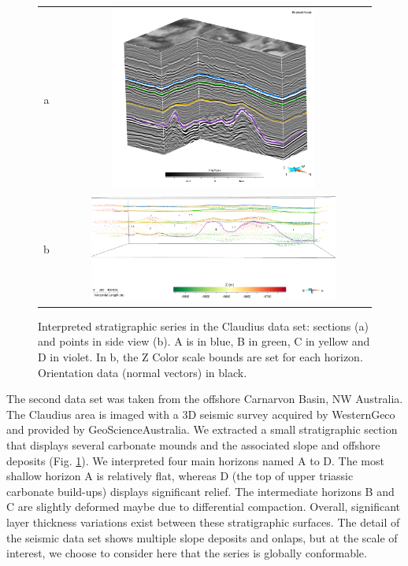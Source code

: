 \documentclass[final]{ring20}
\begin{document}
\begin{figure}

\centering\begin{tabular}{cc}
a & \includegraphics[width=0.7\textwidth,height=6cm]{Claudius}\\
b & \includegraphics[width=0.8\textwidth]{Claudius1} \\
\end{tabular}
\caption{Interpreted stratigraphic series in the Claudius data set: sections (a) and points in side view (b). A is in blue, B in green, C in yellow and D in violet. In b, the Z Color scale bounds are set for each horizon. Orientation data (normal vectors) in black.}
\label{fig:ClaudiusData}
\end{figure}


The second data set was taken from the offshore Carnarvon Basin, NW Australia. The Claudius area is imaged with a 3D seismic survey acquired by WesternGeco and provided by GeoScienceAustralia. We extracted a small stratigraphic section that displays several carbonate mounds and the associated slope and offshore deposits (Fig. \ref{fig:ClaudiusData}). We interpreted four main horizons named A to D. The most shallow horizon A is relatively flat, whereas D (the top of upper triassic carbonate build-ups) displays significant relief. The intermediate horizons B and C are slightly deformed maybe due to differential compaction. Overall, significant layer thickness variations exist between these stratigraphic surfaces. The detail of the seismic data set shows multiple slope deposits and onlaps, but at the scale of interest, we choose to consider here that the series is globally conformable. 
\end{document}
